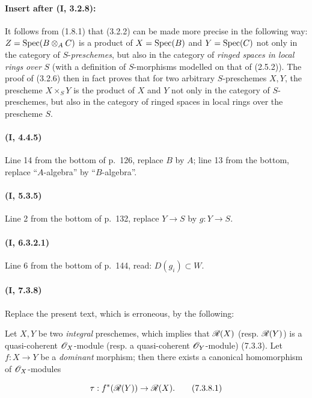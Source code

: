 \paragraph{Insert after (\textbf{I}, 3.2.8):}

\begin{env}[3.2.9]
\label{ega2:addendum:I.3.2.9}
It follows from (1.8.1) that (3.2.2) can be made more precise in the
following way: $Z=\operatorname{Spec}(B\otimes_A C)$ is a product of
$X=\operatorname{Spec}(B)$ and $Y=\operatorname{Spec}(C)$ not only in the category of $S$-\emph{preschemes},
but also in the category of \emph{ringed spaces in local rings}
\emph{over} $S$ (with a definition of $S$-morphisms modelled on
that of (2.5.2)). The proof of (3.2.6) then in fact proves
that for two arbitrary $S$-preschemes $X,Y$, the prescheme
$X\times_S Y$ is the product of $X$ and $Y$ not only in the
category of $S$-preschemes, but also in the category of ringed
spaces in local rings over the prescheme $S$.
\end{env}

\paragraph{(\textbf{I}, 4.4.5)}
Line 14 from the bottom of p.~126, replace $B$ by $A$; line 13 from the
bottom, replace ``$A$-algebra'' by ``$B$-algebra''.

\paragraph{(\textbf{I}, 5.3.5)}
Line 2 from the bottom of p.~132, replace $Y\to S$ by $g:Y\to S$.

\paragraph{(\textbf{I}, 6.3.2.1)}
Line 6 from the bottom of p.~144, read: $D(g_i)\subset W$.

\paragraph{(\textbf{I}, 7.3.8)}
Replace the present text, which is erroneous, by the following:

Let $X,Y$ be two \emph{integral} preschemes, which implies that
$\mathscr{R}(X)$ (resp. $\mathscr{R}(Y)$) is a quasi-coherent $\mathscr{O}_X$-module
(resp. a quasi-coherent $\mathscr{O}_Y$-module) (7.3.3). Let $f:X\to Y$ be a
\emph{dominant} morphism; then there exists a canonical homomorphism of
$\mathscr{O}_X$-modules
\begin{equation}
\label{ega2:addendum:I.7.3.8.1}
  \tau:f^*(\mathscr{R}(Y))\to\mathscr{R}(X).
\tag{7.3.8.1}
\end{equation}

